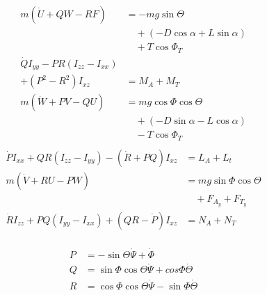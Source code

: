 \documentclass[10pt]{IEEEtran}
\begin{document}
\begin{equation}
    \begin{split}
        m\left(\dot{U}+QW-RF\right) &= -mg\sin \Theta \\
        &\quad+ \left(-D\cos \alpha + L\sin\alpha\right)\\
        &\quad+ T \cos\Phi_T \\
        \dot{Q}I_{yy} -PR\left(I_{zz}-I_{xx}\right)&\\
         + \left(P^2-R^2\right)I_{xz} &= M_A + M_T \\
        m\left(\dot{W}+PV-QU\right) &= mg\cos\Phi\cos\Theta \\
        &\quad+ \left(-D\sin\alpha - L\cos\alpha\right)\\ &\quad-T\cos\Phi_T \\
    \end{split}
    \label{eq:lon_eom}
\end{equation}
\begin{equation}
    \begin{split}
        \dot{P}I_{xx} + QR\left(I_{zz}-I_{yy}\right) - \left(\dot{R} + PQ \right)I_{xz} &= L_A + L_t \\
        m\left(\dot{V} + RU - PW\right) &= mg\sin\Phi\cos\Theta\\
        &\quad + F_{A_y} + F_{T_y} \\
        \dot{R}I_{zz} + PQ\left(I_{yy}-I_{xx}\right) + \left(QR - \dot{P}\right)I_{xz} &= N_A + N_T \\
    \end{split}
    \label{eq:lat_eom}
\end{equation}

\begin{equation}
    \begin{split}
        P &= -\sin\Theta\dot{\Psi} + \dot{\Phi} \\
        Q &= \sin\Phi\cos\Theta\dot{\Psi} + cos\Phi\dot{\Theta} \\
        R &= \cos\Phi\cos\Theta\dot{\Psi} - \sin\Phi\dot{\Theta} \\
    \end{split}
    \label{eq:kinematics}
\end{equation}
\end{document}
